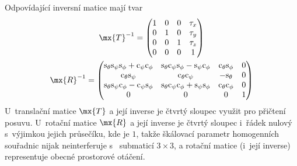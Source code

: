 Odpovídající inversní matice mají tvar
\begin{gather}
  \mx{T}^{-1} =
  \begin{pmatrix}
    1&0&0&\tau_{x}\\
    0&1&0&\tau_{y}\\
    0&0&1&\tau_{z}\\
    0&0&0&1
  \end{pmatrix}                                               \label{EQitrans}\\
  \mx{R}^{-1} =
  \begin{pmatrix}
    \mathrm{s}_{\theta} \mathrm{s}_{\psi} \mathrm{s}_{\phi}
      + \mathrm{c}_{\psi} \mathrm{c}_{\phi}&
    \mathrm{s}_{\theta} \mathrm{c}_{\psi} \mathrm{s}_{\phi}
      - \mathrm{s}_{\psi} \mathrm{c}_{\phi}&
    \mathrm{c}_{\theta} \mathrm{s}_{\phi}&
    0\\
    \mathrm{c}_{\theta} \mathrm{s}_{\psi}&
    \mathrm{c}_{\theta} \mathrm{c}_{\psi}&
    -\mathrm{s}_{\theta}&
    0\\
    \mathrm{s}_{\theta} \mathrm{s}_{\psi} \mathrm{c}_{\phi}
      - \mathrm{c}_{\psi} \mathrm{s}_{\phi}&
    \mathrm{s}_{\theta} \mathrm{c}_{\psi} \mathrm{c}_{\phi}
      + \mathrm{s}_{\psi} \mathrm{s}_{\phi}&
    \mathrm{c}_{\theta} \mathrm{c}_{\phi}&
    0\\
    0& 0& 0& 1
  \end{pmatrix}                                                   \label{EQirot}
\end{gather}
U~translační matice $\mx{T}$ a její inverse je čtvrtý sloupec využit pro
přičtení posuvu. U~rotační matice $\mx{R}$ a její inverse je čtvrtý sloupec
i~řádek nulový s~výjimkou jejich průsečíku, kde je $1$, takže škálovací
parametr homogenních souřadnic nijak neinterferuje s~
submaticí $3\times 3$, a rotační matice (i~její inverse) representuje obecné
prostorové otáčení.

